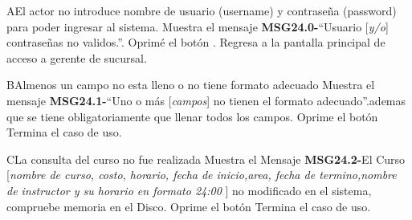 \begin{UCtrayectoriaA}{A}{El actor no introduce nombre de usuario (username) y contraseña (password) para poder ingresar al sistema.}
			\UCpaso Muestra el mensaje {\bf MSG24.0-}``Usuario [{\em y/o}] contraseñas no validos.''.
			\UCpaso[\UCactor] Oprimé el botón .
			\UCpaso Regresa a la pantalla principal de acceso a gerente de sucursal.
		\end{UCtrayectoriaA}

		\begin{UCtrayectoriaA}{B}{Almenos un campo no esta lleno o no tiene formato adecuado}
			\UCpaso Muestra el mensaje {\bf MSG24.1-}``Uno o más [{\em campos}] no tienen el formato adecuado''.ademas que se tiene obligatoriamente que llenar todos los campos.
			\UCpaso[\UCactor] Oprime el botón 
			\UCpaso[] Termina el caso de uso.
		\end{UCtrayectoriaA}
		
		\begin{UCtrayectoriaA}{C}{La consulta del curso no fue realizada }
			\UCpaso Muestra el Mensaje {\bf MSG24.2-}El Curso [{\em nombre de curso, costo, horario, fecha de inicio,area, fecha de termino,nombre de instructor y su  horario en formato 24:00 }] no modificado en el sistema, compruebe memoria en el Disco.
			\UCpaso[\UCactor] Oprime el botón 
			\UCpaso[] Termina el caso de uso.
		\end{UCtrayectoriaA}	
